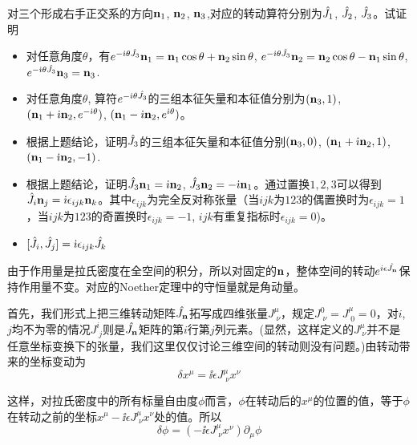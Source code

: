 \documentclass[CJK]{beamer}
\begin{document}
\begin{frame}
\bch
对三个形成右手正交系的方向${\mathbf{n}}_1$, ${\mathbf{n}}_2$, ${\mathbf{n}}_3$,对应的转动算符分别为$\hat{J_{ 1 }} $, $\hat{J_{ 2 }} $, $\hat{J_{ 3 }} $。试证明
\begin{itemize}
\item{对任意角度$\theta$，有$e^{-{\dot{\imath}}\theta\hat{J_{ 3 }} }{\mathbf{n}}_1 =  {\mathbf{n}}_1 \cos\theta + {\mathbf{n}}_2 \sin\theta$, $e^{-{\dot{\imath}}\theta\hat{J_{ 3 }} }{\mathbf{n}}_2 = {\mathbf{n}}_2 \cos\theta - {\mathbf{n}}_1 \sin\theta$, $e^{-{\dot{\imath}}\theta\hat{J_{ 3 }}}{\mathbf{n}}_3 = {\mathbf{n}}_3$. }
\item{对任意角度$\theta$, 算符$e^{-{\dot{\imath}}\theta\hat{J_{ 3 }} }$的三组本征矢量和本征值分别为$({\mathbf{n}}_3, 1)$, $({\mathbf{n}}_1+{\dot{\imath}}{\mathbf{n}}_2, e^{-{\dot{\imath}}\theta})$, $({\mathbf{n}}_1-{\dot{\imath}}{\mathbf{n}}_2, e^{{\dot{\imath}}\theta})$。}
\item{根据上题结论，证明$\hat{J_{ 3 }}$的三组本征矢量和本征值分别$({\mathbf{n}}_3, 0)$, $({\mathbf{n}}_1+{\dot{\imath}}{\mathbf{n}}_2, 1)$, $({\mathbf{n}}_1-{\dot{\imath}}{\mathbf{n}}_2, -1)$}.
\item{根据上题结论，证明$\hat{J_{ 3 }}{\mathbf{n}}_1={\dot{\imath}}{\mathbf{n}}_2$, $\hat{J_{ 3 }} {\mathbf{n}}_2 = -{\dot{\imath}}{\mathbf{n}}_1$。通过置换$1,2,3$可以得到$\hat{J_{ i }}{\mathbf{n}}_j = {\dot{\imath}}\epsilon_{ijk}{\mathbf{n}}_k$。其中$\epsilon_{ijk}$为完全反对称张量（当$ijk$为$123$的偶置换时为$\epsilon_{ijk}=1$，当$ijk$为$123$的奇置换时$\epsilon_{ijk}=-1$, $ijk$有重复指标时$\epsilon_{ijk} = 0$)。}
\item{$[\hat{J_{ i }}, \hat{J_{ j }} ] = {\dot{\imath}} \epsilon_{ijk}\hat{J_{ k }} $}
\end{itemize}
\ech
\end{frame}



\begin{frame}
\bch
由于作用量是拉氏密度在全空间的积分，所以对固定的${\mathbf{n}}$，整体空间的转动$e^{i\epsilon{\hat{J_{\mathbf{n}}}}}$保持作用量不变。对应的Noether定理中的守恒量就是角动量。

\skipline
首先，我们形式上把三维转动矩阵${\hat{J_{\mathbf{n}}}}$拓写成四维张量$J^{\mu}_{\;\nu}$，规定$J^0_{\;\nu} = J^\mu_{\;0} = 0$，对$i$, $j$均不为零的情况$J^i_{\;j}$则是${\hat{J_{\mathbf{n}}}}$矩阵的第$i$行第$j$列元素。(显然，这样定义的$J^\mu_{\;\nu}$并不是任意坐标变换下的张量，我们这里仅仅讨论三维空间的转动则没有问题。)由转动带来的坐标变动为
$$ \delta x^\mu =   \ii \epsilon J^\mu_{\;\nu} x^\nu$$

这样，对拉氏密度中的所有标量自由度$\phi$而言，$\phi$在转动后的$x^\mu$的位置的值，等于$\phi$在转动之前的坐标$x^\mu - \ii\epsilon J^\mu_{\;\nu} x^\nu$处的值。所以
$$\delta \phi = (-\ii \epsilon J^\mu_{\;\nu} x^\nu)\partial_\mu \phi$$

\ech
\end{frame}
\end{document}
